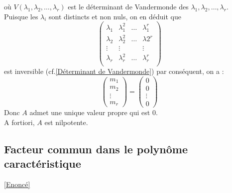 \documentclass[8pt]{book}
\begin{document}
	où $V(\lambda_1,\lambda_2,\dots, \lambda_r)$ est le déterminant de Vandermonde des $\lambda_1,\lambda_2,\dots,\lambda_r$.\\
	Puisque les $\lambda_i$ sont distincts et non nuls, on en déduit que \[\begin{pmatrix}
		\lambda_1&\lambda_1^2&\dots&\lambda_1^r\\
		\lambda_2&\lambda_2^2&\dots&\lambda2^r\\
		\vdots&\vdots&&\vdots\\
		\lambda_r&\lambda_r^2&\dots&\lambda_r^r\\
	\end{pmatrix}\] est inversible (cf.\ref{Déterminant de Vandermonde}) par conséquent, on a : \[\begin{pmatrix}
	m_1\\m_2\\\vdots\\m_r
	\end{pmatrix}=\begin{pmatrix}
	0\\0\\ \vdots \\0
	\end{pmatrix}\]
	Donc $A$ admet une unique valeur propre qui est $0$.\\
	A fortiori, $A$ est nilpotente.
	
	\subsection{Facteur commun dans le polynôme caractéristique}
	\label{Facteur commun dans le polynôme caractéristique corrigé}
	\textcolor{blue}{\hyperref[Facteur commun dans le polynôme caractéristique]{[Enoncé]}}\\
	
\end{document}
